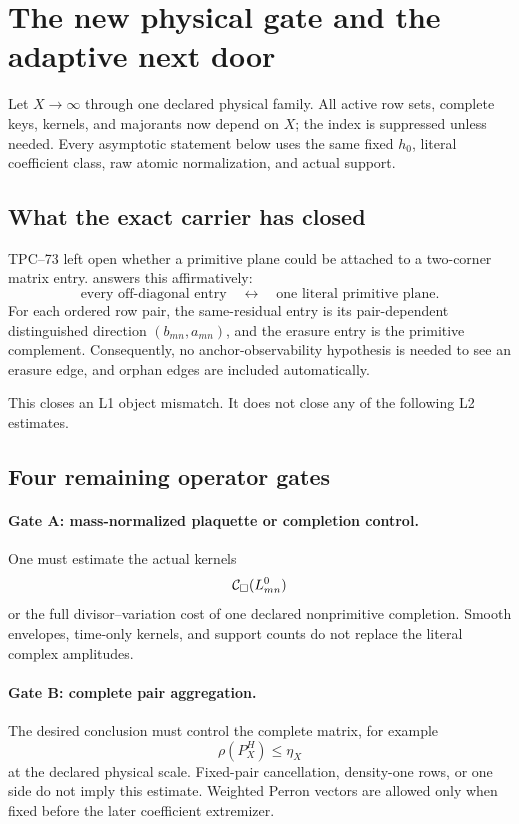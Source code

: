 \section{The new physical gate and the adaptive next door}
\label{sec:physical-gates}

Let \(X\to\infty\) through one declared physical family.  All active row
sets, complete keys, kernels, and majorants now depend on \(X\); the index
is suppressed unless needed.  Every asymptotic statement below uses the
same fixed \(h_0\), literal coefficient class, raw atomic normalization,
and actual support.

\subsection{What the exact carrier has closed}

TPC--73 left open whether a primitive plane could be attached to a
two-corner matrix entry.   answers this
affirmatively:
\[
 \text{every off-diagonal entry}
 \quad\longleftrightarrow\quad
 \text{one literal primitive plane}.
\]
For each ordered row pair, the same-residual entry is its pair-dependent
distinguished direction \((b_{mn},a_{mn})\), and the erasure entry is the
primitive complement.  Consequently, no anchor-observability
hypothesis is needed to see an erasure edge, and orphan edges are included
automatically.

This closes an L1 object mismatch.  It does not close any of the following
L2 estimates.

\subsection{Four remaining operator gates}

\paragraph{Gate A: mass-normalized plaquette or completion control.}
One must estimate the actual kernels
\[
 \mathcal C_\square(L_{mn}^{0})
\]
or the full divisor--variation cost of one declared nonprimitive
completion.  Smooth envelopes, time-only kernels, and support counts do
not replace the literal complex amplitudes.

\paragraph{Gate B: complete pair aggregation.}
The desired conclusion must control the complete matrix, for example
\[
 \rho(P_X^H)\le\eta_X
\]
at the declared physical scale.  Fixed-pair cancellation, density-one
rows, or one side do not imply this estimate.  Weighted Perron vectors are
allowed only when fixed before the later coefficient extremizer.

